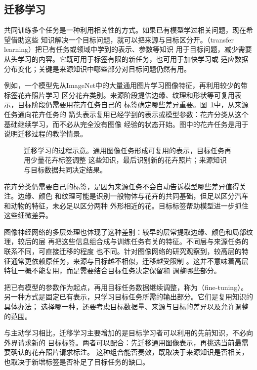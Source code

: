 \subsection{迁移学习}
\label{sec:transfer-learning}

共同训练多个任务是一种利用相关性的方式。如果已有模型学过相关问题，现在希望借助这些
知识解决一个目标问题，就可以把来源与目标区分开。（transfer learning）把已有任务或领域中学到的表示、参数等知识
用于目标问题，减少需要从头学习的内容。它既可用于标签有限的新任务，也可用于加快学习或
适应数据分布变化；关键是来源知识中哪些部分对目标问题仍然有用。

例如，一个模型先从ImageNet中的大量通用图片学习图像特征，再利用较少的带标签花卉照片学习
区分花卉类别。来源阶段提供边缘、纹理和形状等可复用表示，目标阶段仍需要用花卉任务自己的
标签确定哪些差异重要。图~\ref{fig:transfer-learning-process}中，从来源任务通向花卉任务的
箭头表示复用已经学到的表示或模型参数：花卉分类从这个基础继续学习，而不必从完全没有图像
经验的状态开始。图中的花卉任务是用于说明迁移过程的教学情景。

\begin{figure}[!htb]
  \centering
  \caption{迁移学习的过程示意。通用图像任务形成可复用的表示，目标任务再用少量花卉标签调整
  这些知识，最后识别新的花卉照片；来源知识与目标数据共同决定结果。}
  \label{fig:transfer-learning-process}
\end{figure}
\FloatBarrier

花卉分类仍需要自己的标签，是因为来源任务不会自动告诉模型哪些差异值得关注。边缘、颜色
和纹理可能是识别一般物体与花卉的共同基础，但足以区分汽车和动物的特征，未必足以区分两种
外形相近的花。目标标签帮助模型进一步抓住这些细微差异。

图像神经网络的多层处理也体现了这种差别：较早的层常提取边缘、颜色和局部纹理，较后的层
再把这些信息组合成与训练任务有关的特征。不同层与来源任务的联系不同，可直接迁移的程度
也不同。针对图像网络的研究观察到，较高层的特征通常更依赖原任务，来源与目标越不相似，迁移越受限制
。这并不意味着高层特征一概不能复用，而是需要结合目标任务决定保留和
调整哪些部分。

把已有模型的参数作为起点，再用目标任务数据继续调整，称为（fine-tuning）。
另一种方式是固定已有表示，只学习目标任务所需的输出部分。它们是复用知识的具体办法；
选择哪一种，还要考虑目标数据量、来源与目标的差异以及允许调整的范围。

与主动学习相比，迁移学习主要增加的是目标学习者可以利用的先前知识，不必向外界请求新的
目标标签。两者可以配合：先迁移通用图像表示，再挑选当前最需要确认的花卉照片请求标注。
这种组合能否奏效，既取决于来源知识是否相关，也取决于新增标签是否补足了目标任务的缺口。

